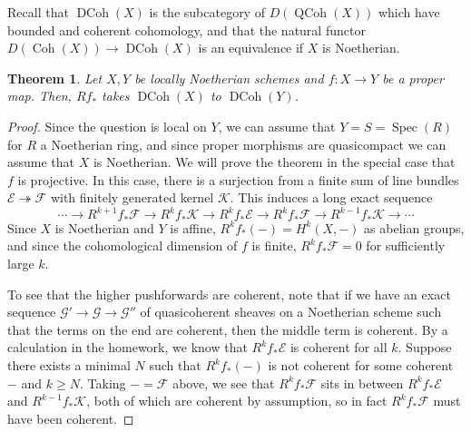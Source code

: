 \documentclass[10pt]{article}
\newtheorem{thm}{Theorem}[section]
\newtheorem{lemma}[thm]{Lemma}
\theoremstyle{definition}
\DeclareMathOperator{\Coh}{Coh}
\DeclareMathOperator{\Spec}{Spec}
\DeclareMathOperator{\QCoh}{QCoh}
\DeclareMathOperator{\DCoh}{DCoh}
\begin{document}

Recall that $\DCoh(X)$ is the subcategory of $D(\QCoh(X))$ which have bounded and coherent cohomology, and that the natural functor $D(\Coh(X)) \rightarrow \DCoh(X)$ is an equivalence if $X$ is Noetherian.
\begin{thm}
Let $X, Y$ be locally Noetherian schemes and $f: X \rightarrow Y$ be a proper map.  Then, $Rf_*$ takes $\DCoh(X)$ to $\DCoh(Y)$.
\end{thm}
\begin{proof}
Since the question is local on $Y$, we can assume that $Y = S = \Spec(R)$ for $R$ a Noetherian ring, and since proper morphisms are quasicompact we can assume that $X$ is Noetherian.
%
We will prove the theorem in the special case that $f$ is projective.  In this case, there is a surjection from a finite sum of line bundles $\mathcal{E} \twoheadrightarrow \mathcal{F}$ with finitely generated kernel $\mathcal{K}$.  This induces a long exact sequence
$$\cdots \rightarrow R^{k+1} f_* \mathcal{F} \rightarrow R^k f_* \mathcal{K} \rightarrow R^k f_* \mathcal{E} \rightarrow R^k f_* \mathcal{F} \rightarrow R^{k-1} f_* \mathcal{K} \rightarrow \cdots$$
Since $X$ is Noetherian and $Y$ is affine, $R^k f_*(-) = H^k(X, -)$ as abelian groups, and since the cohomological dimension of $f$ is finite, $R^k f_* \mathcal{F} = 0$ for sufficiently large $k$.  

To see that the higher pushforwards are coherent, note that if we have an exact sequence $\mathcal{G}' \rightarrow \mathcal{G} \rightarrow \mathcal{G}''$ of quasicoherent sheaves on a Noetherian scheme such that the terms on the end are coherent, then the middle term is coherent.  By a calculation in the homework, we know that $R^k f_* \mathcal{E}$ is coherent for all $k$.  Suppose there exists a minimal $N$ such that $R^k f_*(-)$ is not coherent for some coherent $-$ and $k \geq N$.  Taking $- = \mathcal{F}$ above, we see that $R^k f_* \mathcal{F}$ sits in between $R^k f_* \mathcal{E}$ and $R^{k-1} f_* \mathcal{K}$, both of which are coherent by assumption, so in fact $R^k f_* \mathcal{F}$ must have been coherent.
\end{proof}
\end{document}
